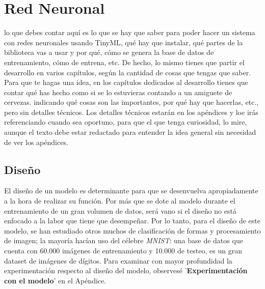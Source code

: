 \chapter{Red Neuronal}
{\color{red} lo que debes contar aquí es lo que se hay
que saber para poder hacer un sistema con redes neuronales usando
TinyML, qué hay que instalar, qué partes de la biblioteca vas a usar
y por qué, cómo se genera la base de datos de entrenamiento, cómo
de entrena, etc. De hecho, lo mismo tienes que partir el desarrollo en
varios capítulos, según la cantidad de cosas que tengas que saber.
Para que te hagas una idea, en los capítulos dedicados al desarrollo
tienes que contar qué has hecho como si se lo estuvieras contando a
un amiguete de cervezas. indicando qué cosas son las importantes, por
qué hay que hacerlas, etc., pero sin detalles técnicos. Los detalles
técnicos estarán en los apéndices y loe irás referenciando cuando
sea oportuno, para que el que tenga curiosidad, lo mire, aunque el
texto debe estar redactado para entender la idea general sin necesidad
de ver los apéndices. }

\section{Diseño}
El diseño de un modelo es determinante para que se desenvuelva apropiadamente
a la hora de realizar su función. Por más que se dote al modelo durante el
entrenamiento de un gran volumen de datos, será vano si el diseño no está enfocado
a la labor que tiene que desempeñar. Por lo tanto, para el diseño de este modelo,
se han estudiado otros muchos de clasificación de formas y procesamiento de imagen; la
mayoría hacían uso del célebre \textit{MNIST}: una base de datos que cuenta con
60.000 imágenes de entrenamiento y 10.000 de testeo, es un gran dataset de imágenes
de dígitos.\newline
Para examinar con mayor profundidad la experimentación respecto al diseño del modelo,
observesé '\textbf{Experimentación con el modelo}' en el Apéndice.

